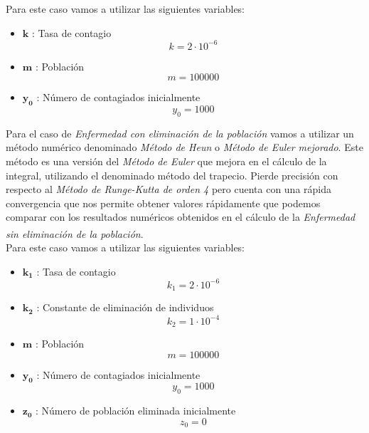 \documentclass[a4paper,11pt]{article}
\numberwithin{equation}{section}
\begin{document}
\indent Para este caso vamos a utilizar las siguientes variables:
\begin{itemize}
	\item $ \boldsymbol{k} $ : Tasa de contagio
	\begin{equation}
	k=2\cdot 10^{-6}
	\end{equation}
	\item $ \boldsymbol{m} $ : Población
	\begin{equation}
	m=100000
	\end{equation}
	\item $ \boldsymbol{y_0} $ : Número de contagiados inicialmente
	\begin{equation}
	y_0=1000
	\end{equation}
\end{itemize}

\indent Para el caso de \textit{Enfermedad con eliminación de la población} vamos a utilizar un método numérico denominado \textit{Método de Heun} o \textit{Método de Euler mejorado}. Este método es una versión del \textit{Método de Euler} que mejora en el cálculo de la integral, utilizando el denominado método del trapecio. Pierde precisión con respecto al \textit{Método de Runge-Kutta de orden 4} pero cuenta con una rápida convergencia que nos permite obtener valores rápidamente que podemos comparar con los resultados numéricos obtenidos en el cálculo de la \textit{Enfermedad sin eliminación de la población}.{\tiny \bf \textsuperscript{\cite{hoja2}}} \\

\indent Para este caso vamos a utilizar las siguientes variables:
\begin{itemize}
	\item $ \boldsymbol{k_1} $ : Tasa de contagio
	\begin{equation}
	k_1=2\cdot 10^{-6}
	\end{equation}
	\item $ \boldsymbol{k_2} $ : Constante de eliminación de individuos
	\begin{equation}
	k_2=1\cdot 10^{-4}
	\end{equation}
	\item $ \boldsymbol{m} $ : Población
	\begin{equation}
	m=100000
	\end{equation}
	\item $ \boldsymbol{y_0} $ : Número de contagiados inicialmente
	\begin{equation}
	y_0=1000
	\end{equation}
	\item $ \boldsymbol{z_0} $ : Número de población eliminada inicialmente
	\begin{equation}
	z_0=0
	\end{equation}
\end{itemize}
\end{document}
